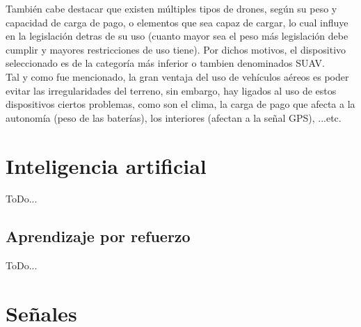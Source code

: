 También cabe destacar que existen múltiples tipos de drones, según su peso y capacidad de carga de pago, o elementos que sea capaz de cargar, lo cual influye en la legislación detras de su uso (cuanto mayor sea el peso más legislación debe cumplir y mayores restricciones de uso tiene). Por dichos motivos, el dispositivo seleccionado es de la categoría más inferior o tambien denominados \ac{SUAV}.\\

Tal y como fue mencionado, la gran ventaja del uso de vehículos aéreos es poder evitar las irregularidades del terreno, sin embargo, hay ligados al uso de estos dispositivos ciertos problemas, como son el clima, la carga de pago que afecta a la autonomía (peso de las baterías), los interiores (afectan a la señal GPS), ...etc.\\

\section{Inteligencia artificial}
\label{subsec:inteligencia_artificial}

ToDo...

\subsection{Aprendizaje por refuerzo}
\label{subsec:aprendizaje_por_refuerzo}

ToDo...

\section{Señales}
\label{subsec:señales}